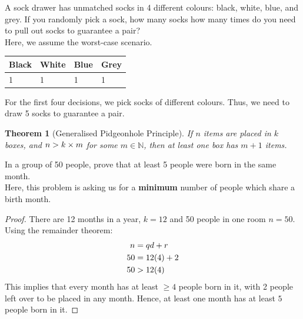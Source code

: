 \documentclass[12pt]{article}
\newcommand{\gt}{\ensuremath >}
\newcommand{\N}{\mathbb{N}}
\newtheorem{theorem}{Theorem}
\theoremstyle{definition}
\begin{document}
    \begin{example}
        A sock drawer has unmatched socks in 4 different colours: black, white, blue, and
        grey. If you randomly pick a sock, how many socks how many times do you need to pull
        out socks to guarantee a pair? \\

        Here, we assume the worst-case scenario.\\

        \begin{center}
        \begin{tabular}{| m{3cm} | m{3cm} | m{3cm} | m{3cm} |}
            \hline
            Black & White & Blue & Grey \\
            \hline
            1 & 1 & 1 & 1 \\
            \hline
        \end{tabular}
        \end{center}
        \vspace{25px}

        For the first four decisions, we pick socks of different colours. Thus, we need
        to draw 5 socks to guarantee a pair.
    \end{example}
    \vspace{25px}

    \begin{theorem}[Generalised Pidgeonhole Principle]
        \label{thm:generalised-pidgeonhole-principle}
        If $n$ items are placed in $k$ boxes, and $n \gt k \times m$ for some $m \in \N$,
        then at least one box has $m+1$ items. \\
    \end{theorem}

    \begin{example}
        In a group of 50 people, prove that at least 5 people were born in the same month. \\

        Here, this problem is asking us for a \textbf{minimum} number of people which share
        a birth month.
        \begin{proof}
            There are 12 months in a year, $k = 12$ and 50 people in one room $n=50$.
            Using the remainder theorem:
            \begin{align*}
                n &= qd + r \\
                50 &= 12(4) + 2 \\
                50 & \gt 12 (4)
            \end{align*}
            This implies that every month has at least $\ge 4$ people born in it, with 2 people
            left over to be placed in any month. Hence, at least one month has at least $5$
            people born in it.
        \end{proof}
    \end{example}
\end{document}
